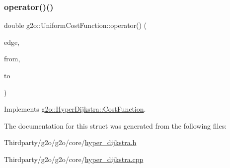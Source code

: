 \subsubsection{\texorpdfstring{operator()()}{operator()()}}
{\footnotesize\ttfamily double g2o\+::\+Uniform\+Cost\+Function\+::operator() (\begin{DoxyParamCaption}\item[{\mbox{\hyperlink{classg2o_1_1_hyper_graph_1_1_edge}{Hyper\+Graph\+::\+Edge}} $\ast$}]{edge,  }\item[{\mbox{\hyperlink{classg2o_1_1_hyper_graph_1_1_vertex}{Hyper\+Graph\+::\+Vertex}} $\ast$}]{from,  }\item[{\mbox{\hyperlink{classg2o_1_1_hyper_graph_1_1_vertex}{Hyper\+Graph\+::\+Vertex}} $\ast$}]{to }\end{DoxyParamCaption})\hspace{0.3cm}{\ttfamily [virtual]}}



Implements \mbox{\hyperlink{structg2o_1_1_hyper_dijkstra_1_1_cost_function_a6d30ca80400c75941851ae079cfd42fd}{g2o\+::\+Hyper\+Dijkstra\+::\+Cost\+Function}}.



The documentation for this struct was generated from the following files\+:\begin{DoxyCompactItemize}
\item 
Thirdparty/g2o/g2o/core/\mbox{\hyperlink{hyper__dijkstra_8h}{hyper\+\_\+dijkstra.\+h}}\item 
Thirdparty/g2o/g2o/core/\mbox{\hyperlink{hyper__dijkstra_8cpp}{hyper\+\_\+dijkstra.\+cpp}}\end{DoxyCompactItemize}
